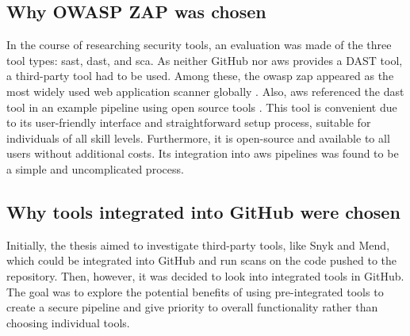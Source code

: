 \subsection{Why OWASP ZAP was chosen}
In the course of researching security tools, an evaluation was made of the three tool types: \acrshort{sast},  \acrshort{dast}, and \acrshort{sca}. As neither GitHub nor \acrshort{aws} provides a DAST tool, a third-party tool had to be used. Among these, the \acrshort{owasp} \acrshort{zap} appeared as the most widely used web application scanner globally \cite{owaspzap1}. Also, \acrshort{aws} referenced the \acrshort{dast} tool in an example pipeline using open source tools \cite{inofpipeline}. This tool is convenient due to its user-friendly interface and straightforward setup process, suitable for individuals of all skill levels. Furthermore, it is open-source and available to all users without additional costs. Its integration into \acrshort{aws} \gls{pipeline}s was found to be a simple and uncomplicated process.

\subsection{Why tools integrated into GitHub were chosen}
Initially, the thesis aimed to investigate third-party tools, like Snyk and Mend, which could be integrated into GitHub and run scans on the code pushed to the repository. Then, however, it was decided to look into integrated tools in GitHub. The goal was to explore the potential benefits of using pre-integrated tools to create a secure \gls{pipeline} and give priority to overall functionality rather than choosing individual tools.

